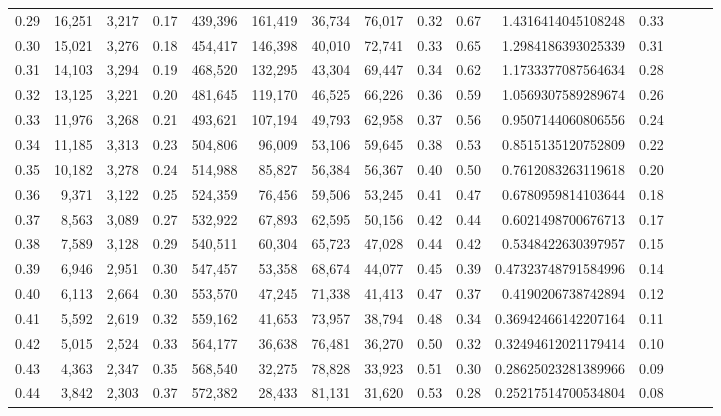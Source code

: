 \begin{tabular}{rrrrrrrrrrrrrrr}
0.29 &  16,251 &  3,217 &  0.17 &  439,396 &  161,419 &   36,734 &   76,017 &  0.32 &  0.67 &      1.4316414045108248 &      0.33 \\
0.30 &  15,021 &  3,276 &  0.18 &  454,417 &  146,398 &   40,010 &   72,741 &  0.33 &  0.65 &      1.2984186393025339 &      0.31 \\
0.31 &  14,103 &  3,294 &  0.19 &  468,520 &  132,295 &   43,304 &   69,447 &  0.34 &  0.62 &      1.1733377087564634 &      0.28 \\
0.32 &  13,125 &  3,221 &  0.20 &  481,645 &  119,170 &   46,525 &   66,226 &  0.36 &  0.59 &      1.0569307589289674 &      0.26 \\
0.33 &  11,976 &  3,268 &  0.21 &  493,621 &  107,194 &   49,793 &   62,958 &  0.37 &  0.56 &      0.9507144060806556 &      0.24 \\
0.34 &  11,185 &  3,313 &  0.23 &  504,806 &   96,009 &   53,106 &   59,645 &  0.38 &  0.53 &      0.8515135120752809 &      0.22 \\
0.35 &  10,182 &  3,278 &  0.24 &  514,988 &   85,827 &   56,384 &   56,367 &  0.40 &  0.50 &      0.7612083263119618 &      0.20 \\
0.36 &   9,371 &  3,122 &  0.25 &  524,359 &   76,456 &   59,506 &   53,245 &  0.41 &  0.47 &      0.6780959814103644 &      0.18 \\
0.37 &   8,563 &  3,089 &  0.27 &  532,922 &   67,893 &   62,595 &   50,156 &  0.42 &  0.44 &      0.6021498700676713 &      0.17 \\
0.38 &   7,589 &  3,128 &  0.29 &  540,511 &   60,304 &   65,723 &   47,028 &  0.44 &  0.42 &      0.5348422630397957 &      0.15 \\
0.39 &   6,946 &  2,951 &  0.30 &  547,457 &   53,358 &   68,674 &   44,077 &  0.45 &  0.39 &     0.47323748791584996 &      0.14 \\
0.40 &   6,113 &  2,664 &  0.30 &  553,570 &   47,245 &   71,338 &   41,413 &  0.47 &  0.37 &      0.4190206738742894 &      0.12 \\
0.41 &   5,592 &  2,619 &  0.32 &  559,162 &   41,653 &   73,957 &   38,794 &  0.48 &  0.34 &     0.36942466142207164 &      0.11 \\
0.42 &   5,015 &  2,524 &  0.33 &  564,177 &   36,638 &   76,481 &   36,270 &  0.50 &  0.32 &     0.32494612021179414 &      0.10 \\
0.43 &   4,363 &  2,347 &  0.35 &  568,540 &   32,275 &   78,828 &   33,923 &  0.51 &  0.30 &     0.28625023281389966 &      0.09 \\
0.44 &   3,842 &  2,303 &  0.37 &  572,382 &   28,433 &   81,131 &   31,620 &  0.53 &  0.28 &     0.25217514700534804 &      0.08 \\

\end{tabular}
